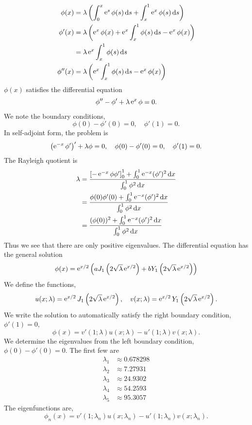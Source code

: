 \begin{Solution}
\begin{enumerate}
\begin{align*}
      \phi(x) &= \lambda \left( \int_0^x \mathop{\mathrm{e}}\nolimits^s \phi(s) \,\mathrm{d} s
        + \int_x^1 \mathop{\mathrm{e}}\nolimits^x \phi(s) \,\mathrm{d} s \right) \\
      \phi'(x) &= \lambda \left( \mathop{\mathrm{e}}\nolimits^x \phi(x) + \mathop{\mathrm{e}}\nolimits^x \int_x^1 \phi(s) \,\mathrm{d} s
        - \mathop{\mathrm{e}}\nolimits^x \phi(x) \right) \\
      &= \lambda \mathop{\mathrm{e}}\nolimits^x \int_x^1 \phi(s) \,\mathrm{d} s \\
      \phi''(x) &= \lambda \left( \mathop{\mathrm{e}}\nolimits^x \int_x^1 \phi(s) \,\mathrm{d} s - \mathop{\mathrm{e}}\nolimits^x \phi(x) \right)
    \end{align*}
    $\phi(x)$ satisfies the differential equation
    \[
    \phi'' - \phi' + \lambda \mathop{\mathrm{e}}\nolimits^x \phi = 0.
    \]
    We note the boundary conditions,
    \[
    \phi(0) - \phi'(0) = 0, \quad
    \phi'(1) = 0.
    \]
    In self-adjoint form, the problem is
    \[
    \left( \mathop{\mathrm{e}}\nolimits^{-x} \phi' \right)' + \lambda \phi = 0, \quad 
    \phi(0) - \phi'(0) = 0, \quad
    \phi'(1) = 0.
    \]
    The Rayleigh quotient is
    \begin{align*}
      \lambda &=  \frac{ \left[ - \mathop{\mathrm{e}}\nolimits^{-x} \phi \phi' \right]_0^1
        + \int_0^1 \mathop{\mathrm{e}}\nolimits^{-x} (\phi')^2 \,\mathrm{d} x }
      { \int_0^1 \phi^2 \,\mathrm{d} x } \\
      &=  \frac{ \phi(0) \phi'(0)
        + \int_0^1 \mathop{\mathrm{e}}\nolimits^{-x} (\phi')^2 \,\mathrm{d} x }
      { \int_0^1 \phi^2 \,\mathrm{d} x } \\
      &=  \frac{ (\phi(0))^2 + \int_0^1 \mathop{\mathrm{e}}\nolimits^{-x} (\phi')^2 \,\mathrm{d} x }
      { \int_0^1 \phi^2 \,\mathrm{d} x } 
    \end{align*}
    Thus we see that there are only positive eigenvalues.
    The differential equation has the general solution
    \[
    \phi(x) = 
    \mathop{\mathrm{e}}\nolimits^{x/2} \left( a J_1 \left( 2 \sqrt{\lambda} \mathop{\mathrm{e}}\nolimits^{x/2} \right)
      + b Y_1 \left( 2 \sqrt{\lambda} \mathop{\mathrm{e}}\nolimits^{x/2} \right) \right)
    \]
    We define the functions,
    \[
    u(x;\lambda) = 
    \mathop{\mathrm{e}}\nolimits^{x/2} J_1 \left( 2 \sqrt{\lambda} \mathop{\mathrm{e}}\nolimits^{x/2} \right), \quad
    v(x;\lambda) = 
    \mathop{\mathrm{e}}\nolimits^{x/2} Y_1 \left( 2 \sqrt{\lambda} \mathop{\mathrm{e}}\nolimits^{x/2} \right).
    \]
    We write the 
    solution to automatically satisfy the right boundary condition, 
    $\phi'(1) = 0$,
    \[
    \phi(x) = v'(1;\lambda) u(x;\lambda) - u'(1;\lambda) v(x;\lambda).
    \]
    We determine the eigenvalues from the left boundary condition, 
    $\phi(0) - \phi'(0) = 0$.  The first few are
    \begin{align*}
      \lambda_1 &\approx 0.678298 \\
      \lambda_2 &\approx 7.27931 \\
      \lambda_3 &\approx 24.9302 \\
      \lambda_4 &\approx 54.2593 \\
      \lambda_5 &\approx 95.3057 
    \end{align*}
    The eigenfunctions are,
    \[
    \phi_n(x) = v'(1;\lambda_n) u(x;\lambda_n) - u'(1;\lambda_n) v(x;\lambda_n).
    \]
  \end{enumerate}
\end{Solution}



